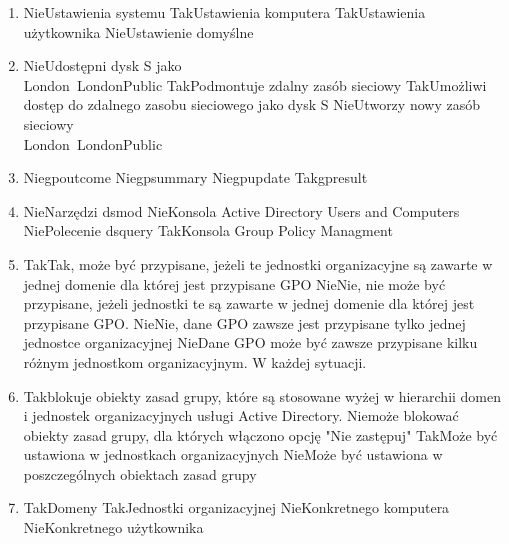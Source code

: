 \begin{enumerate}
		\item {}%
		{Nie}{Ustawienia systemu}%
		{Tak}{Ustawienia komputera}%
		{Tak}{Ustawienia użytkownika}%
		{Nie}{Ustawienie domyślne}
		
		\item {}%
		{Nie}{Udostępni dysk S jako \\London\ LondonPublic}%
		{Tak}{Podmontuje zdalny zasób sieciowy}%
		{Tak}{Umożliwi dostęp do zdalnego zasobu sieciowego jako dysk S}%
		{Nie}{Utworzy nowy zasób sieciowy \\London\ LondonPublic}
		
		\item {}%
		{Nie}{gpoutcome}%
		{Nie}{gpsummary}%
		{Nie}{gpupdate}%
		{Tak}{gpresult}
		
		\item {}%
		{Nie}{Narzędzi dsmod}%
		{Nie}{Konsola Active Directory Users and Computers}%
		{Nie}{Polecenie dsquery}%
		{Tak}{Konsola Group Policy Managment}
		
		\item {}%
		{Tak}{Tak, może być przypisane, jeżeli te jednostki organizacyjne są zawarte w jednej domenie dla której jest przypisane GPO}%
		{Nie}{Nie, nie może być przypisane, jeżeli jednostki te są zawarte w jednej domenie dla której jest przypisane GPO.}%
		{Nie}{Nie, dane GPO zawsze jest przypisane tylko jednej jednostce organizacyjnej}%
		{Nie}{Dane GPO może być zawsze przypisane kilku różnym jednostkom organizacyjnym. W każdej sytuacji.}
		
		\item {}%
		{Tak}{blokuje obiekty zasad grupy, które są stosowane wyżej w hierarchii domen i jednostek organizacyjnych usługi Active Directory.}%
		{Nie}{może blokować obiekty zasad grupy, dla których włączono opcję "Nie zastępuj"}%
		{Tak}{Może być ustawiona w jednostkach organizacyjnych}%
		{Nie}{Może być ustawiona w poszczególnych obiektach zasad grupy}
		
		\item {}%
		{Tak}{Domeny}%
		{Tak}{Jednostki organizacyjnej}%
		{Nie}{Konkretnego komputera}%
		{Nie}{Konkretnego użytkownika}
		

\end{enumerate}
